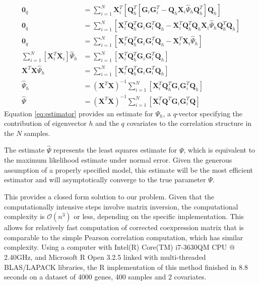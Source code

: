 \begin{align}
\mathbf{0}_{q} & =\sum_{i=1}^{N}\mathbf{X}_{i}^{T}\left[\mathbf{Q}_{h}^{T}\left[\mathbf{G}_{i}\mathbf{G}_{i}^{T}-\mathbf{Q}_{h}\mathbf{X}_{i}\hat{\Psi}_{h}\mathbf{Q}_{h}^{T}\right]\mathbf{Q}_{h}\right]\label{eq:least_squares_zero}\\
\mathbf{0}_{q} & =\sum_{i=1}^{N}\left[\mathbf{X}_{i}^{T}\mathbf{Q}_{h}^{T}\mathbf{G}_{i}\mathbf{G}_{i}^{T}\mathbf{Q}_{h}-\mathbf{X}_{i}^{T}\mathbf{Q}_{h}^{T}\mathbf{Q}_{h}\mathbf{X}_{i}\hat{\Psi}_{h}\mathbf{Q}_{h}^{T}\mathbf{Q}_{h}\right]\nonumber \\
\mathbf{0}_{q} & =\sum_{i=1}^{N}\left[\mathbf{X}_{i}^{T}\mathbf{Q}_{h}^{T}\mathbf{G}_{i}\mathbf{G}_{i}^{T}\mathbf{Q}_{h}-\mathbf{X}_{i}^{T}\mathbf{X}_{i}\hat{\Psi}_{h}\right]\nonumber \\
\sum_{i=1}^{N}\left[\mathbf{X}_{i}^{T}\mathbf{X}_{i}\right]\hat{\Psi}_{h} & =\sum_{i=1}^{N}\left[\mathbf{X}_{i}^{T}\mathbf{Q}_{h}^{T}\mathbf{G}_{i}\mathbf{G}_{i}^{T}\mathbf{Q}_{h}\right]\nonumber \\
\mathbf{X}^{T}\mathbf{X}\hat{\Psi}_{h} & =\sum_{i=1}^{N}\left[\mathbf{X}_{i}^{T}\mathbf{Q}_{h}^{T}\mathbf{G}_{i}\mathbf{G}_{i}^{T}\mathbf{Q}_{h}\right]\nonumber \\
\hat{\Psi}_{h} & =\left(\mathbf{X}^{T}\mathbf{X}\right)^{-1}\sum_{i=1}^{N}\left[\mathbf{X}_{i}^{T}\mathbf{Q}_{h}^{T}\mathbf{G}_{i}\mathbf{G}_{i}^{T}\mathbf{Q}_{h}\right]\label{eq:estimator}\\
\hat{\Psi} & =\left(\mathbf{X}^{T}\mathbf{X}\right)^{-1}\sum_{i=1}^{N}\left[\mathbf{X}_{i}^{T}\mathbf{Q}^{T}\mathbf{G}_{i}\mathbf{G}_{i}^{T}\mathbf{Q}\right]\nonumber 
\end{align}
Equation \ref{eq:estimator} provides an estimate for $\Psi_{h}$,
a $q$-vector specifying the contribution of eigenvector $h$ and
the $q$ covariates to the correlation structure in the $N$ samples.

The estimate $\hat{\Psi}$ represents the least squares estimate for
$\Psi$, which is equivalent to the maximum likelihood estimate under
normal error. Given the generous assumption of a properly specified
model, this estimate will be the most efficient estimator and will
asymptotically converge to the true parameter $\Psi$.

This provides a closed form solution to our problem. Given that the
computationally intensive steps involve matrix inversion, the computational
complexity is $\mathcal{O}(n^{3})$ or less, depending on the specific
implementation. This allows for relatively fast computation of corrected
coexpression matrix that is comparable to the simple Pearson correlation
computation, which has similar complexity. Using a computer with Intel(R)
Core(TM) i7-3630QM CPU @ 2.40GHz, and Microsoft R Open 3.2.5 linked
with multi-threaded BLAS/LAPACK libraries, the R implementation of
this method finished in 8.8 seconds on a dataset of 4000 genes, 400
samples and 2 covariates. 

